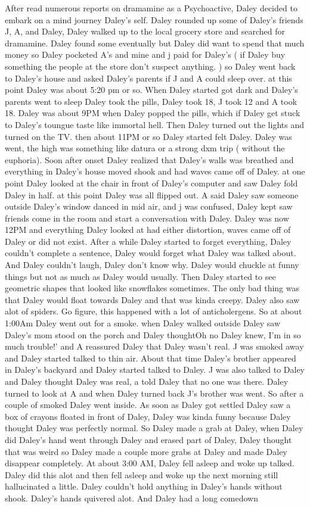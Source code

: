 \documentclass[12pt]{book}
\begin{document}
After read numerous reports on dramamine as a Psychoactive, Daley decided to embark on a mind journey Daley's self. Daley rounded up some of Daley's friends J, A, and Daley, Daley walked up to the local grocery store and searched for dramamine. Daley found some eventually but Daley did want to spend that much money so Daley pocketed A's and mine and j paid for Daley's ( if Daley buy something the people at the store don't suspect anything. ) so Daley went back to Daley's house and asked Daley's parents if J and A could sleep over. at this point Daley was about 5:20 pm or so. When Daley started got dark and Daley's parents went to sleep Daley took the pills, Daley took 18, J took 12 and A took 18. Daley was about 9PM when Daley popped the pills, which if Daley get stuck to Daley's toungue taste like immortal hell. Then Daley turned out the lights and turned on the TV. then about 11PM or so Daley started felt Daley. Daley was went, the high was something like datura or a strong dxm trip ( without the euphoria). Soon after onset Daley realized that Daley's walls was breathed and everything in Daley's house moved shook and had waves came off of Daley. at one point Daley looked at the chair in front of Daley's computer and saw Daley fold Daley in half. at this point Daley was all flipped out. A said Daley saw someone outside Daley's window danced in mid air, and j was confused, Daley kept saw friends come in the room and start a conversation with Daley. Daley was now 12PM and everything Daley looked at had either distortion, waves came off of Daley or did not exist. After a while Daley started to forget everything, Daley couldn't complete a sentence, Daley would forget what Daley was talked about. And Daley couldn't laugh, Daley don't know why. Daley would chuckle at funny things but not as much as Daley would usually. Then Daley started to see geometric shapes that looked like snowflakes sometimes. The only bad thing was that Daley would float towards Daley and that was kinda creepy. Daley also saw alot of spiders. Go figure, this happened with a lot of anticholergens. So at about 1:00Am Daley went out for a smoke. when Daley walked outside Daley saw Daley's mom stood on the porch and Daley thoughtOh no Daley knew, I'm in so much trouble!' and A reassured Daley that Daley wasn't real. J was smoked away and Daley started talked to thin air. About that time Daley's brother appeared in Daley's backyard and Daley started talked to Daley. J was also talked to Daley and Daley thought Daley was real, a told Daley that no one was there. Daley turned to look at A and when Daley turned back J's brother was went. So after a couple of smoked Daley went inside. As soon as Daley got settled Daley saw a box of crayons floated in front of Daley, Daley was kinda funny because Daley thought Daley was perfectly normal. So Daley made a grab at Daley, when Daley did Daley's hand went through Daley and erased part of Daley, Daley thought that was weird so Daley made a couple more grabs at Daley and made Daley disappear completely. At about 3:00 AM, Daley fell asleep and woke up talked. Daley did this alot and then fell asleep and woke up the next morning still hallucinated a little. Daley couldn't hold anything in Daley's hands without shook. Daley's hands quivered alot. And Daley had a long comedown 
\end{document}
